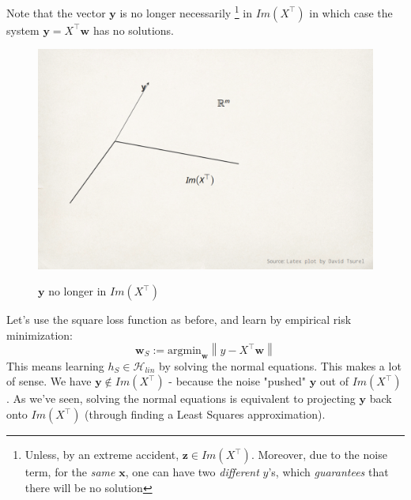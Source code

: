 \documentclass[11pt]{article}
\newcommand{\norm}[1]{\left\| #1\right\|}
\newcommand{\Tr}{\ensuremath{\top}}
\newcommand{\Hc}{\mathcal{H}}
\begin{document}
Note that the vector $\mathbf{y}$ is no longer necessarily \footnote{Unless, by an extreme accident, $\mathbf{z}\in Im(X^\Tr)$. Moreover, due to the noise term, for the \textit{same} $\mathbf{x}$, one can have two \textit{different} $y$'s, which \textit{guarantees} that there will be no solution} in $Im(X^\Tr)$ in which case the system $\mathbf{y}=X^\Tr \mathbf{w}$ has no solutions.



\begin{figure}[h!]
  \centering
    \includegraphics[width=4.5in]{PlotTsurel.png} \\
 \caption{$\mathbf{y}$ no longer in $Im(X^\Tr)$}
\end{figure}



 Let's use the square loss function as before, and learn by empirical risk minimization:
         \[\mathbf{w}_S := \text{argmin}_{\mathbf{w}}\norm{y - X^\Tr \mathbf{w}}
         \]
        This means learning $h_S\in\Hc_{lin}$ by solving the normal equations. This makes a lot of sense.  We have
         $\mathbf{y}\notin Im(X^\Tr)$ - because the noise "pushed" $\mathbf{y}$ out of $Im(X^\Tr)$. As we've seen, solving the normal equations is equivalent to
         projecting $\mathbf{y}$ back onto $Im(X^\Tr)$ (through finding a Least Squares approximation).
\end{document}
